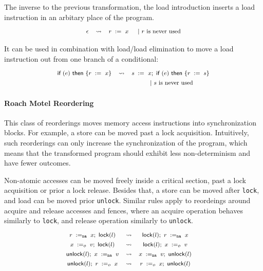 The inverse to the previous transformation, 
the load introduction inserts a load instruction 
in an arbitary place of the program.
%
\[\def\arraystretch{1.4}\footnotesize
  \begin{array}{cccl} 

      \epsInst
    & \leadsto 
    & \readInst{}{r}{x} 
    & ~|~ \text{$r$ is never used}  \\ 

  \end{array}
\]

It can be used in combination with 
load/load elimination to move a load 
instruction out from one branch of 
a conditional:
%
\[\def\arraystretch{1.4}\footnotesize
  \begin{array}{ccc} 

      \kw{if} (e)~ \kw{then} \{ \readInst{}{r}{x} \}
    & \leadsto 
    & \readInst{}{s}{x} \seq \kw{if} (e)~ \kw{then} \{ \assignInst{r}{s} \} \\
    & & ~|~ \text{$s$ is never used}  \\ 

  \end{array}
\]

\paragraph{Roach Motel Reordering}

This class of reorderings moves memory access instructions
into synchronization blocks. For example, a store 
can be moved past a lock acquisition. 
Intuitively, such reorderings can only increase 
the synchronization of the program, 
which means that the transformed program should 
exhibit less non-determinism and have fewer outcomes. 

Non-atomic accesses can be moved freely inside 
a critical section, \ie past a lock acquisition
or prior a lock release. 
Besides that, a store can be moved after \texttt{lock}, 
and load can be moved prior \texttt{unlock}.   
Similar rules apply to reordeings around 
acquire and release accesses and fences, 
where an acquire operation behaves similarly to \texttt{lock}, 
and release operation similarly to \texttt{unlock}.
\[\def\arraystretch{1.4}\footnotesize
  \begin{array}{cccl} 

      \readInst{\na}{r}{x} \seq \lockInst{l} 
    & \leadsto 
    & \lockInst{l} \seq \readInst{\na}{r}{x}
    & ~ \\ 

      \writeInst{o}{x}{v} \seq \lockInst{l} 
    & \leadsto 
    & \lockInst{l} \seq \writeInst{o}{x}{v}
    & ~  \\ 

      \unlockInst{l} \seq \writeInst{\na}{x}{v} 
    & \leadsto 
    & \writeInst{\na}{x}{v} \seq \unlockInst{l}
    & ~ \\ 


      \unlockInst{l} \seq \readInst{o}{r}{x} 
    & \leadsto 
    & \readInst{o}{r}{x} \seq \unlockInst{l}
    & ~  \\ 

  \end{array}
\]


